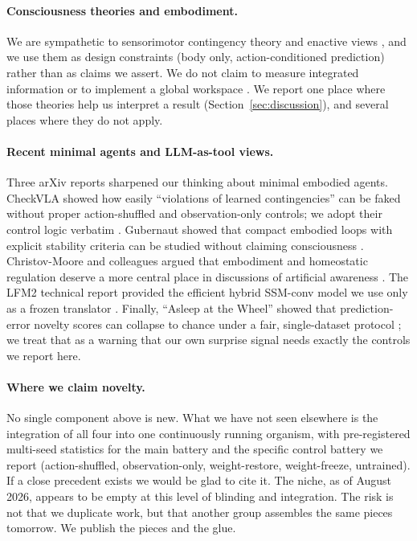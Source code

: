 \documentclass[11pt,a4paper]{article}
\begin{document}
\paragraph{Consciousness theories and embodiment.} We are sympathetic to sensorimotor contingency theory \cite{oregan2001} and enactive views \cite{thompson2007}, and we use them as design constraints (body only, action-conditioned prediction) rather than as claims we assert. We do not claim to measure integrated information \cite{tononi2014} or to implement a global workspace \cite{baars1988, dehaene2011}. We report one place where those theories help us interpret a result (Section~\ref{sec:discussion}), and several places where they do not apply.

\paragraph{Recent minimal agents and LLM-as-tool views.} Three arXiv reports sharpened our thinking about minimal embodied agents. CheckVLA showed how easily ``violations of learned contingencies'' can be faked without proper action-shuffled and observation-only controls; we adopt their control logic verbatim \cite{checkvla2026}. Gubernaut showed that compact embodied loops with explicit stability criteria can be studied without claiming consciousness \cite{gubernaut2026}. Christov-Moore and colleagues argued that embodiment and homeostatic regulation deserve a more central place in discussions of artificial awareness \cite{christovmoore2025}. The LFM2 technical report provided the efficient hybrid SSM-conv model we use only as a frozen translator \cite{lfm2025}. Finally, ``Asleep at the Wheel'' showed that prediction-error novelty scores can collapse to chance under a fair, single-dataset protocol \cite{probe2026}; we treat that as a warning that our own surprise signal needs exactly the controls we report here.

\paragraph{Where we claim novelty.} No single component above is new. What we have not seen elsewhere is the integration of all four into one continuously running organism, with pre-registered multi-seed statistics for the main battery and the specific control battery we report (action-shuffled, observation-only, weight-restore, weight-freeze, untrained). If a close precedent exists we would be glad to cite it. The niche, as of August 2026, appears to be empty at this level of blinding and integration. The risk is not that we duplicate work, but that another group assembles the same pieces tomorrow. We publish the pieces and the glue.
\end{document}
